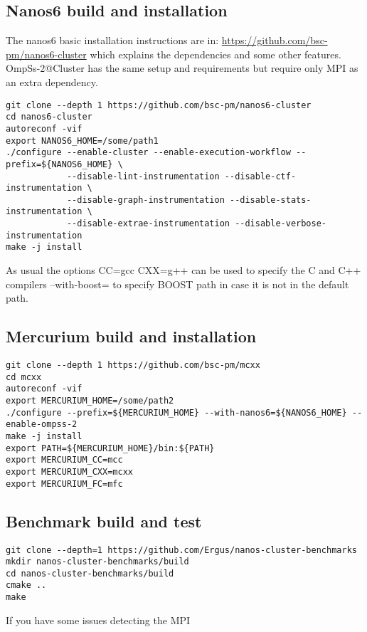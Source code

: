 \documentclass{article}
\begin{document}
\subsection{Nanos6 build and installation}

The nanos6 basic installation instructions are in:
\url{https://github.com/bsc-pm/nanos6-cluster} which explains the
dependencies and some other features.  OmpSs-2@Cluster has the same
setup and requirements but require only MPI as an extra dependency.

\begin{lstlisting}
git clone --depth 1 https://github.com/bsc-pm/nanos6-cluster
cd nanos6-cluster
autoreconf -vif
export NANOS6_HOME=/some/path1
./configure --enable-cluster --enable-execution-workflow --prefix=${NANOS6_HOME} \
            --disable-lint-instrumentation --disable-ctf-instrumentation \
            --disable-graph-instrumentation --disable-stats-instrumentation \
            --disable-extrae-instrumentation --disable-verbose-instrumentation
make -j install
\end{lstlisting}

As usual the options CC=gcc CXX=g++ can be used to specify the C and
C++ compilers --with-boost= to specify BOOST path in case it is not in
the default path.

\subsection{Mercurium build and installation}

\begin{lstlisting}
git clone --depth 1 https://github.com/bsc-pm/mcxx
cd mcxx
autoreconf -vif
export MERCURIUM_HOME=/some/path2
./configure --prefix=${MERCURIUM_HOME} --with-nanos6=${NANOS6_HOME} --enable-ompss-2
make -j install
export PATH=${MERCURIUM_HOME}/bin:${PATH}
export MERCURIUM_CC=mcc
export MERCURIUM_CXX=mcxx
export MERCURIUM_FC=mfc
\end{lstlisting}

\subsection{Benchmark build and test}

\begin{lstlisting}
git clone --depth=1 https://github.com/Ergus/nanos-cluster-benchmarks
mkdir nanos-cluster-benchmarks/build
cd nanos-cluster-benchmarks/build
cmake ..
make
\end{lstlisting}

If you have some issues detecting the MPI 
\end{document}
